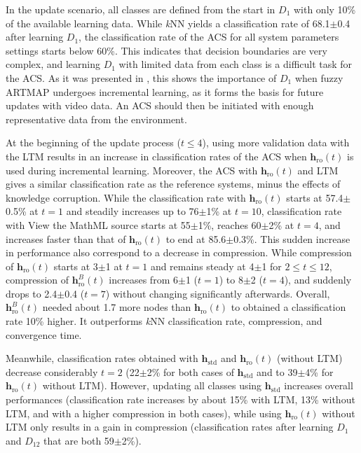 In the update scenario, all classes are defined from the start in $D_1$ with only 10\% of the available learning data. While \textit{k}NN yields a classification rate of 68.1$\pm$0.4 after learning $D_1$, the classification rate of the ACS for all system parameters settings starts below 60\%. This indicates that decision boundaries are very complex, and learning $D_1$ with limited data from each class is a difficult task for the ACS. As it was presented in \cite{granger08, connolly08}, this shows the importance of $D_1$ when fuzzy ARTMAP undergoes incremental learning, as it forms the basis for future updates with video data. An ACS should then be initiated with enough representative data from the environment.

At the beginning of the update process ($t \leq 4$), using more validation data with the LTM results in an increase in classification rates of the ACS when $\textbf{h}_\text{ro}(t)$ is used during incremental learning. Moreover, the ACS with $\textbf{h}_\text{ro}(t)$ and LTM gives a similar classification rate as the reference systems, minus the effects of knowledge corruption. While the classification rate with $\textbf{h}_\text{ro}(t)$ starts at 57.4$\pm$0.5\% at $t=1$ and steadily increases up to 76$\pm$1\% at $t=10$, classification rate with View the MathML source starts at 55$\pm$1\%, reaches 60$\pm$2\% at $t=4$, and increases faster than that of $\textbf{h}_\text{ro}(t)$ to end at 85.6$\pm$0.3\%. This sudden increase in performance also correspond to a decrease in compression. While compression of $\textbf{h}_\text{ro}(t)$ starts at 3$\pm$1 at $t=1$ and remains steady at 4$\pm$1 for $ 2\leq t \leq12$, compression of $\textbf{h}_\text{ro}^B(t)$ increases from 6$\pm$1 ($t=1$) to 8$\pm$2 ($t=4$), and suddenly drops to 2.4$\pm$0.4 ($t=7$) without changing significantly afterwards. Overall, $\textbf{h}_\text{ro}^B(t)$ needed about 1.7 more nodes than $\textbf{h}_\text{ro}(t)$ to obtained a classification rate 10\% higher. It outperforms \textit{k}NN classification rate, compression, and convergence time.

Meanwhile, classification rates obtained with $\textbf{h}_\text{std}$ and $\textbf{h}_\text{ro}(t)$ (without LTM) decrease considerably $t=2$ (22$\pm$2\% for both cases of $\textbf{h}_\text{std}$ and to 39$\pm$4\% for $\textbf{h}_\text{ro}(t)$ without LTM). However, updating all classes using $\textbf{h}_\text{std}$ increases overall performances (classification rate increases by about 15\% with LTM, 13\% without LTM, and with a higher compression in both cases), while using $\textbf{h}_\text{ro}(t)$ without LTM only results in a gain in compression (classification rates after learning $D_1$ and $D_{12}$ that are both 59$\pm$2\%).

